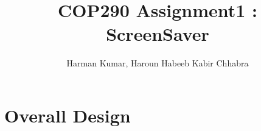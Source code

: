 \documentclass[•]{article}
\begin{document}
\title{COP290 Assignment1 : ScreenSaver}
\author{Harman Kumar, Haroun Habeeb Kabir Chhabra}
\maketitle

\begin{abstract}

\end{abstract}


\section{Overall Design}
\end{document}
